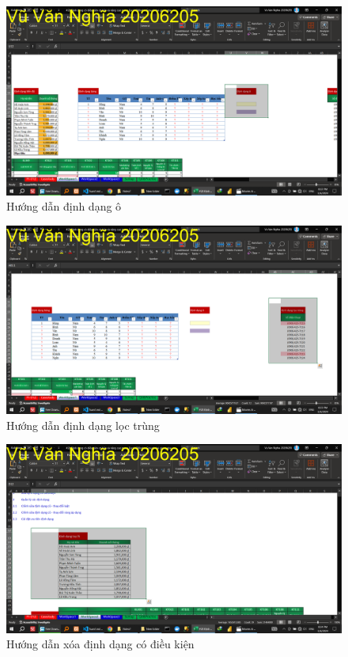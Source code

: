 \documentclass{article}
\begin{document}
\begin{figure}[H]
\centering
\includegraphics[scale = 0.15]{Video7/HuongDan/4.png}
\caption{Hướng dẫn định dạng ô}
\end{figure}

\begin{figure}[H]
\centering
\includegraphics[scale = 0.15]{Video7/HuongDan/5.png}
\caption{Hướng dẫn định dạng lọc trùng}
\end{figure}

\begin{figure}[H]
\centering
\includegraphics[scale = 0.15]{Video7/HuongDan/6.png}
\caption{Hướng dẫn xóa định dạng có điều kiện}
\end{figure}
\end{document}
